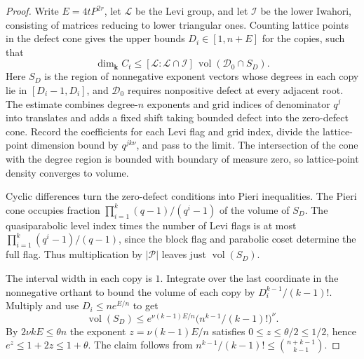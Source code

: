 \begin{proof}
Write $E=4tP^{2r}$, let $\mathcal L$ be the Levi group, and let $\mathcal I$ be the lower Iwahori, consisting of matrices reducing to lower triangular ones. Counting lattice points in the defect cone gives the upper bounds $D_i\in[1,n+E]$ for the copies, such that
\[
 \dim_{\mathbf k} C_t
 \le [\mathcal L:\mathcal L\cap\mathcal I]\,
       \operatorname{vol}(\mathcal D_0\cap S_D).
\]
Here $S_D$ is the region of nonnegative exponent vectors whose degrees in each copy lie in $[D_i-1,D_i]$, and $\mathcal D_0$ requires nonpositive defect at every adjacent root. The estimate combines degree-$n$ exponents and grid indices of denominator $q^j$ into translates and adds a fixed shift taking bounded defect into the zero-defect cone. Record the coefficients for each Levi flag and grid index, divide the lattice-point dimension bound by $q^{j k\nu}$, and pass to the limit. The intersection of the cone with the degree region is bounded with boundary of measure zero, so lattice-point density converges to volume.

Cyclic differences turn the zero-defect conditions into Pieri inequalities. The Pieri cone occupies fraction $\prod_{i=1}^k(q-1)/(q^i-1)$ of the volume of $S_D$. The quasiparabolic level index times the number of Levi flags is at most $\prod_{i=1}^k(q^i-1)/(q-1)$, since the block flag and parabolic coset determine the full flag. Thus multiplication by $|\mathcal P|$ leaves just $\operatorname{vol}(S_D)$.

The interval width in each copy is $1$. Integrate over the last coordinate in the nonnegative orthant to bound the volume of each copy by $D_i^{k-1}/(k-1)!$. Multiply and use $D_i\le ne^{E/n}$ to get
\[
 \operatorname{vol}(S_D)\le e^{\nu(k-1) E/n}
           \bigl(n^{k-1}/(k-1)!\bigr)^{\nu}.
\]
By $2\nu k E\le\theta n$ the exponent $z=\nu(k-1)E/n$ satisfies $0\le z\le\theta/2\le 1/2$, hence $e^z\le1+2z\le1+\theta$. The claim follows from $n^{k-1}/(k-1)!\le\binom{n+k-1}{k-1}$.
\end{proof}

